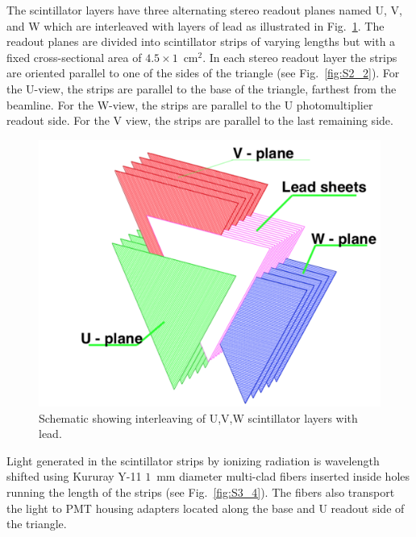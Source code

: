 The scintillator layers have three alternating stereo readout planes named U, V, and W which are interleaved
with layers of lead as illustrated in Fig.~\ref{fig:S3_2}. The readout planes are divided into scintillator strips
of varying lengths but with a fixed cross-sectional area of $4.5 \times 1$~cm$^2$. In each stereo readout layer
the strips are oriented parallel to one of the sides of the triangle (see Fig.~\ref{fig:S2_2}). For the U-view, the
strips are parallel to the base of the triangle, farthest from the beamline. For the W-view, the strips are parallel
to the U photomultiplier readout side. For the V view, the strips are parallel to the last remaining side.  

\begin{figure}[hbt]
\centering
\includegraphics[width=0.95\columnwidth,keepaspectratio]{img/S3_2.png}
\caption[PCAL UVW Layers]{Schematic showing interleaving of U,V,W scintillator layers with lead.}
\label{fig:S3_2}
\end{figure}

Light generated in the scintillator strips by ionizing radiation is wavelength shifted using Kururay Y-11 $1$~mm
diameter multi-clad fibers inserted inside holes running the length of the strips (see Fig.~\ref{fig:S3_4}). The
fibers also transport the light to PMT housing adapters located along the base and U readout side of the triangle.

